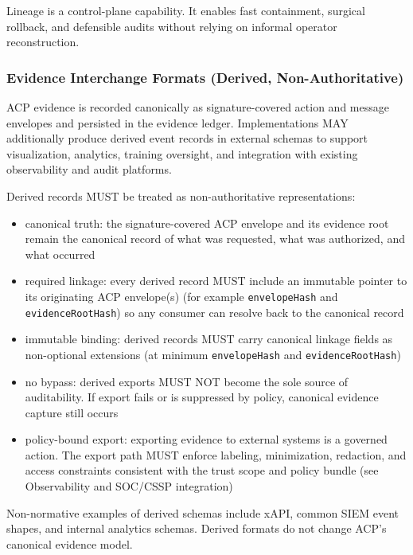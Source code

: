 \documentclass[11pt]{article}
\begin{document}
Lineage is a control-plane capability. It enables fast containment,
surgical rollback, and defensible audits without relying on informal
operator reconstruction.

\hypertarget{evidence-interchange-formats-derived-non-authoritative}{%
\subsubsection{Evidence Interchange Formats (Derived, Non-Authoritative)}\label{evidence-interchange-formats-derived-non-authoritative}}

ACP evidence is recorded canonically as signature-covered action and
message envelopes and persisted in the evidence ledger. Implementations
MAY additionally produce derived event records in external schemas to
support visualization, analytics, training oversight, and integration
with existing observability and audit platforms.

Derived records MUST be treated as non-authoritative representations:

\begin{itemize}
\tightlist
\item
  canonical truth: the signature-covered ACP envelope and its evidence
  root remain the canonical record of what was requested, what was
  authorized, and what occurred
\item
  required linkage: every derived record MUST include an immutable
  pointer to its originating ACP envelope(s) (for example
  \texttt{envelopeHash} and \texttt{evidenceRootHash}) so any consumer
  can resolve back to the canonical record
\item
  immutable binding: derived records MUST carry canonical linkage fields
  as non-optional extensions (at minimum \texttt{envelopeHash} and
  \texttt{evidenceRootHash})
\item
  no bypass: derived exports MUST NOT become the sole source of
  auditability. If export fails or is suppressed by policy, canonical
  evidence capture still occurs
\item
  policy-bound export: exporting evidence to external systems is a
  governed action. The export path MUST enforce labeling, minimization,
  redaction, and access constraints consistent with the trust scope and
  policy bundle (see Observability and SOC/CSSP integration)
\end{itemize}

Non-normative examples of derived schemas include xAPI, common SIEM
event shapes, and internal analytics schemas. Derived formats do not
change ACP's canonical evidence model.
\end{document}
